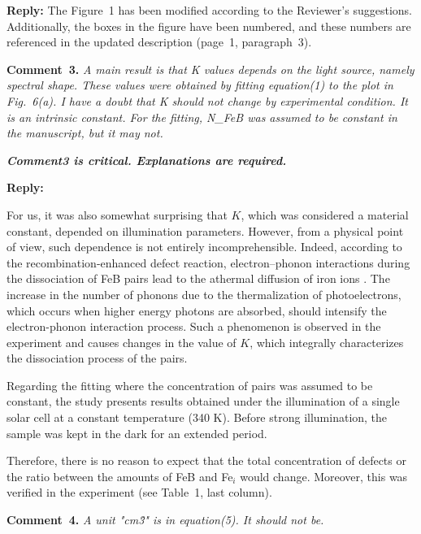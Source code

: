 \documentclass{WileyMSP-template}
\begin{document}
\noindent
\textcolor[rgb]{0.51,0.00,0.00}{\textbf{Reply:}}
The Figure~1 has been modified according to the Reviewer’s suggestions. 
Additionally, the boxes in the figure have been numbered, 
and these numbers are referenced in the updated description
(page~1, paragraph~3).


\vspace{1cm}
\noindent
\textcolor[rgb]{0.00,0.50,1.00}{\textbf{Comment~3.}}
\emph{A main result is that K values depends on the light source, namely spectral shape.
These values were obtained by fitting equation(1) to the plot in Fig.~6(a).
I have a doubt that K should not change by experimental condition.
It is an intrinsic constant.
For the fitting, N\_FeB was assumed to be constant in the manuscript, but it may not.}

\emph{
\textbf{Comment3 is critical. Explanations are required.}
}

\noindent
\textcolor[rgb]{0.51,0.00,0.00}{\textbf{Reply:}}


For us, it was also somewhat surprising that $K$,
which was considered a material constant, depended on illumination parameters.
However, from a physical point of view, such dependence is not entirely incomprehensible.
Indeed, according to the recombination-enhanced defect reaction,
electron--phonon interactions during the dissociation of FeB pairs lead to the athermal diffusion of iron ions \cite{FeBKin2019,KIMERLINGFeB}.
The increase in the number of phonons due to the thermalization of photoelectrons,
which occurs when higher energy photons are absorbed,
should intensify the electron-phonon interaction process.
Such a phenomenon is observed in the experiment and causes changes in the value of $K$,
which integrally characterizes the dissociation process of the pairs.

Regarding the fitting where the concentration of pairs was assumed to be constant,
the study presents results obtained under the illumination of a single solar cell at a constant temperature (340 K).
Before strong illumination, the sample was kept in the dark for an extended period.

Therefore, there is no reason to expect that the total concentration of defects or the ratio between the amounts
of FeB and Fe$_i$ would change.
Moreover, this was verified in the experiment (see Table~1, last column).


\vspace{1cm}
\noindent
\textcolor[rgb]{0.00,0.50,1.00}{\textbf{Comment~4.}}
\emph{A unit "cm\^3" is in equation(5). It should not be.}
\end{document}
